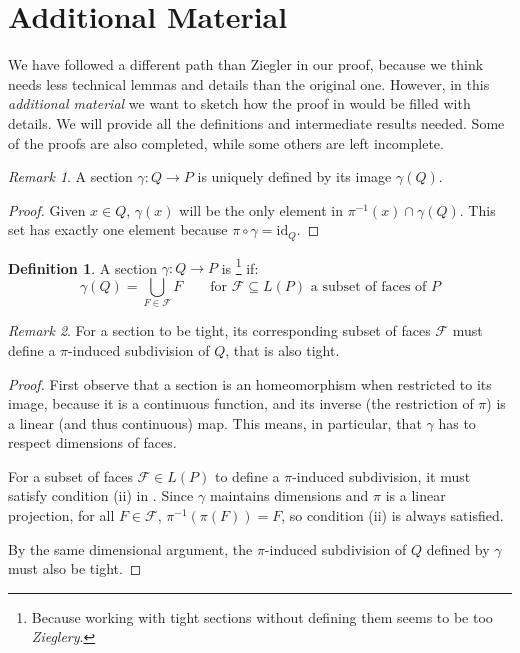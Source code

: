 \documentclass[10pt,a4paper]{article}
\let\emph\relax %
\theoremstyle{plain}
\theoremstyle{remark}
\newtheorem{remark}{Remark}
\theoremstyle{definition}
\newtheorem{definition}{Definition}
\begin{document}


\section*{Additional Material}

We have followed a different path than Ziegler in our proof,
because we think needs less technical lemmas and details
than the original one.
However, in this \textit{additional material} we want to sketch
how the proof in \cite[Thm. 9.4]{ziegler2012lectures}
would be filled with details.
We will provide all the definitions and intermediate results needed.
Some of the proofs are also completed, while some others are left incomplete.

\begin{remark}
	A section $\gamma:Q\to P$ is uniquely defined by its image $\gamma (Q)$.
\end{remark}
\begin{proof}
	Given $x\in Q$, $\gamma(x)$ will be the only element in 
	$\pi^{-1}(x)\cap \gamma(Q)$. 
	This set has exactly one element because $\pi\circ \gamma = \mathrm{id}_Q$.
\end{proof}

\begin{definition}
	A section $\gamma:Q\to P$ is \emph{tight}
	\footnote{Because working with tight sections without defining them
		seems to be too \textit{Zieglery}.}
	if:
	\begin{equation}
	\gamma(Q) = \bigcup_{F\in \mathcal F} F \qquad 
	\mbox{for $\mathcal F\subseteq L (P)$ a subset of faces of $P$}		
	\end{equation} 
\end{definition}
\begin{remark}
	For a section to be tight, its corresponding subset of faces $\mathcal{F}$
	must define a $\pi$-induced subdivision of $Q$, that is also tight.
\end{remark}
\begin{proof}
	First observe that a section is an homeomorphism when restricted to its image,
	because it is a continuous function, and its inverse (the restriction of $\pi$)
	is a linear (and thus continuous) map. 
	This means, in particular, that $\gamma$ has to respect dimensions of faces.
	
	For a subset of faces $\mathcal F\in L(P)$ to define a $\pi$-induced subdivision,
	it must satisfy condition (ii) in \cite[Def 9.1]{ziegler2012lectures}.
	Since $\gamma$ maintains dimensions and $\pi$ is a linear projection, 
	for all $F\in \mathcal F$, $\pi^{-1}(\pi(F)) = F$,
	so condition (ii) is always satisfied.
	
	By the same dimensional argument, the $\pi$-induced subdivision of $Q$ 
	defined by $\gamma$ must also be tight. 
\end{proof} 
\end{document}
